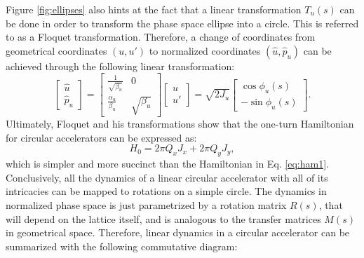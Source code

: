 Figure \ref{fig:ellipses} also hints at the fact that a linear transformation $T_u(s)$ can be done in order to transform the phase space ellipse into a circle. This is referred to as a Floquet transformation. Therefore, a change of coordinates from geometrical coordinates $(u,u')$ to normalized coordinates $(\hat{u},\hat{p}_u)$ can be achieved through the following linear transformation:
\begin{equation}
    \label{eq:floquet}
    \begin{bmatrix} 
        \hat{u} \\
        \hat{p}_u     
    \end{bmatrix}
    =
    \begin{bmatrix} 
        \frac{1}{\sqrt{\beta_u}} & 0 \\ 
        \frac{\alpha_u}{\beta_u} & \sqrt{\beta_u}
    \end{bmatrix}
    \begin{bmatrix} 
        u \\
        u'     
    \end{bmatrix}
    =
    \sqrt{2J_u}
    \begin{bmatrix} 
        \cos \phi _u (s) \\
        -\sin \phi _u (s)    
    \end{bmatrix}.
\end{equation}
Ultimately, Floquet and his transformations show that the one-turn Hamiltonian for circular accelerators can be expressed as:
\begin{equation}
    \label{eq:hflo}
    H_0=2\pi Q_x J_x + 2\pi Q_y J_y,
\end{equation}
which is simpler and more succinct than the Hamiltonian in Eq. \ref{eq:ham1}. Conclusively, all the dynamics of a linear circular accelerator with all of its intricacies can be mapped to rotations on a simple circle. The dynamics in normalized phase space is just parametrized by a rotation matrix $R(s)$, that will depend on the lattice itself, and is analogous to the transfer matrices $M(s)$ in geometrical space. Therefore, linear dynamics in a circular accelerator can be summarized with the following commutative diagram:      
